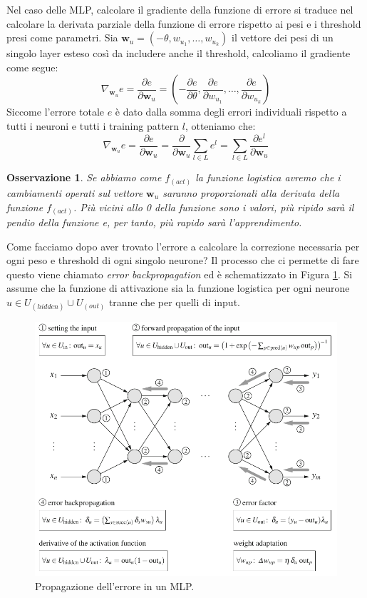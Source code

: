 \documentclass[10pt,a4paper]{article}
\newtheorem{remark}{Osservazione}
\newcommand{\ww}{\mathbf{w}}
\begin{document}
Nel caso delle MLP, calcolare il gradiente della funzione di errore si traduce nel calcolare la derivata parziale della funzione di errore rispetto ai pesi e i threshold presi come parametri. Sia $\ww_u = (-\theta,w_{u_1},\dots,w_{u_k})$ il vettore dei pesi di un singolo layer esteso così da includere anche il threshold, calcoliamo il gradiente come segue:
$$
\nabla_{\ww_u} e = \frac{\partial e}{\partial \ww_u} = (-\frac{\partial e}{\partial \theta}, \frac{\partial e}{\partial w_{u_1}},\dots,\frac{\partial e}{\partial w_{u_k}})
$$
Siccome l'errore totale $e$ è dato dalla somma degli errori individuali rispetto a tutti i neuroni e tutti i training pattern $l$, otteniamo che:
$$
\nabla_{\ww_u} e = \frac{\partial e}{\partial \ww_u} = \frac{\partial}{\partial \ww_u} \sum_{l \in L} e^l = \sum_{l \in L} \frac{\partial e^l}{\partial \ww_u}
$$
\begin{remark}
\emph{Se abbiamo come $f_{(act)}$ la funzione logistica avremo che i cambiamenti operati sul vettore $\ww_u$ saranno proporzionali alla derivata della funzione $f_{(act)}$. Più vicini allo 0 della funzione sono i valori, più ripido sarà il pendio della funzione e, per tanto, più rapido sarà l'apprendimento.}
\end{remark}

Come facciamo dopo aver trovato l'errore a calcolare la correzione necessaria per ogni peso e threshold di ogni singolo neurone? Il processo che ci permette di fare questo viene chiamato \emph{error backpropagation} ed è schematizzato in Figura \ref{fig:14}. Si assume che la funzione di attivazione sia la funzione logistica per ogni neurone $u \in U_{(hidden)} \cup U_{(out)}$ tranne che per quelli di input.

\begin{figure}
\centering
\includegraphics[scale=0.4]{img/backpropagation.png}
\caption{Propagazione dell'errore in un MLP.}
\label{fig:14}
\end{figure}
\end{document}
